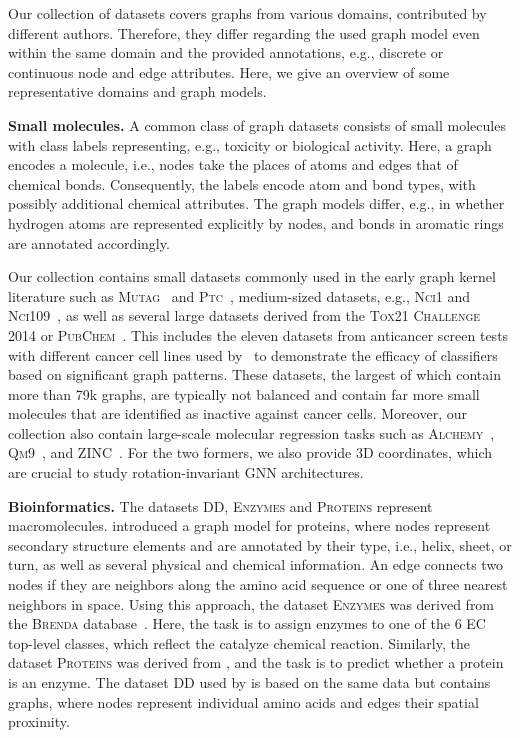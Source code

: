 \documentclass{article}
\newcommand{\xhdr}[1]{{\noindent\bfseries #1}}
\theoremstyle{definition}
\begin{document}
Our collection of datasets covers graphs from various domains, contributed by different authors. Therefore, they differ regarding the used graph model even within the same domain and the provided annotations, e.g., discrete or continuous node and edge attributes. Here, we give an overview of some representative domains and graph models.

\xhdr{Small molecules.} 
A common class of graph datasets consists of small molecules with class labels representing, e.g., toxicity or biological activity. Here, a graph encodes a molecule, i.e., nodes take the places of atoms and edges that of chemical bonds. Consequently, the labels encode atom and bond types, with possibly additional chemical attributes. The graph models differ, e.g., in whether hydrogen atoms are represented explicitly by nodes, and bonds in aromatic rings are annotated accordingly.

Our collection contains small datasets commonly used in the early graph kernel literature such as \textsc{Mutag}~\cite{Deb+1991} and \textsc{Ptc}~\cite{Helma2001}, medium-sized datasets, e.g., \textsc{Nci1} and \textsc{Nci109}~\cite{Wal+2008,She+2011}, as well as several large datasets derived from the \textsc{Tox21 Challenge 2014} or \textsc{PubChem}~\cite{Kim2018}. This includes the eleven datasets from anticancer screen tests with different cancer cell lines used by~\citet{Yan2008} to demonstrate the efficacy of classifiers based on significant graph patterns. These datasets, the largest of which contain more than 79k graphs, are typically not balanced and contain far more small molecules that are identified as inactive against cancer cells. Moreover, our collection also contain large-scale molecular regression tasks such as \textsc{Alchemy}~\cite{Che+2020}, \textsc{Qm9}~\cite{Ram+2014}, and \textsc{ZINC}~\cite{Dwi+2020,Jin+2018a}. For the two formers, we also provide 3D coordinates, which are crucial to study rotation-invariant GNN architectures.

\xhdr{Bioinformatics.}
The datasets \textsc{DD}, \textsc{Enzymes} and \textsc{Proteins} represent macromolecules. \citet{Bor+2005a} introduced a graph model for proteins, where nodes represent secondary structure elements and are annotated by their type, i.e., helix, sheet, or turn, as well as several physical and chemical information. An edge connects two nodes if they are neighbors along the amino acid sequence or one of three nearest neighbors in space. Using this approach, the dataset \textsc{Enzymes} was derived from the \textsc{Brenda} database~\cite{Schomburg2004}. Here, the task is to assign enzymes to one of the 6 EC top-level classes, which reflect the catalyze chemical reaction. Similarly, the dataset \textsc{Proteins} was derived from \citep{Dob+2003}, and the task is to predict whether a protein is an enzyme. The dataset \textsc{DD} used by \citet{She+2011} is based on the same data but contains graphs, where nodes represent individual amino acids and edges their spatial proximity.
\end{document}
